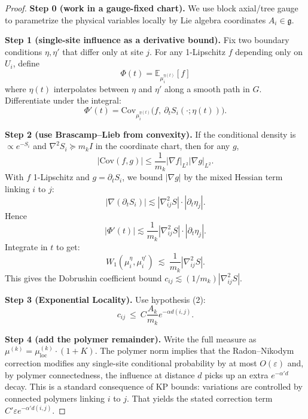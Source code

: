 \begin{proof}
\textbf{Step 0 (work in a gauge-fixed chart).}
We use block axial/tree gauge to parametrize the physical variables locally by Lie algebra coordinates $A_i\in\mathfrak g$.

\textbf{Step 1 (single-site influence as a derivative bound).}
Fix two boundary conditions $\eta,\eta'$ that differ only at site $j$. For any 1-Lipschitz $f$ depending only on $U_i$, define
\begin{equation}
\Phi(t)=\mathbb E_{\mu_i^{\eta(t)}}[f]
\end{equation}
where $\eta(t)$ interpolates between $\eta$ and $\eta'$ along a smooth path in $G$.
Differentiate under the integral:
\begin{equation}
\Phi'(t)=\mathrm{Cov}_{\mu_i^{\eta(t)}}\bigl(f,\ \partial_t S_i(\cdot;\eta(t))\bigr).
\end{equation}

\textbf{Step 2 (use Brascamp--Lieb from convexity).}
If the conditional density is $\propto e^{-S_i}$ and $\nabla^2 S_i\succeq m_k I$ in the coordinate chart, then for any $g$,
\begin{equation}
|\mathrm{Cov}(f,g)| \le \frac{1}{m_k}|\nabla f|_{L^2}|\nabla g|_{L^2}.
\end{equation}
With $f$ 1-Lipschitz and $g=\partial_t S_i$, we bound $|\nabla g|$ by the mixed Hessian term linking $i$ to $j$:
\begin{equation}
|\nabla(\partial_t S_i)|\lesssim |\nabla^2_{ij}S|\cdot |\partial_t \eta_j|.
\end{equation}
Hence
\begin{equation}
|\Phi'(t)|\lesssim \frac{1}{m_k}|\nabla^2_{ij}S|\cdot |\partial_t \eta_j|.
\end{equation}
Integrate in $t$ to get:
\begin{equation}
W_1(\mu_i^\eta,\mu_i^{\eta'})\ \lesssim\ \frac{1}{m_k}|\nabla^2_{ij}S|.
\end{equation}
This gives the Dobrushin coefficient bound $c_{ij}\lesssim (1/m_k)|\nabla^2_{ij}S|$.

\textbf{Step 3 (Exponential Locality).}
Use hypothesis (2):
\begin{equation}
c_{ij}\ \le\ C\frac{A_k}{m_k}e^{-\alpha d(i,j)}.
\end{equation}

\textbf{Step 4 (add the polymer remainder).}
Write the full measure as $\mu^{(k)}=\mu^{(k)}_{\mathrm{loc}}\cdot(1+K)$. The polymer norm implies that the Radon--Nikodym correction modifies any single-site conditional probability by at most $O(\varepsilon)$ and, by polymer connectedness, the influence at distance $d$ picks up an extra $e^{-\alpha'd}$ decay. This is a standard consequence of KP bounds: variations are controlled by connected polymers linking $i$ to $j$.
That yields the stated correction term $C'\varepsilon e^{-\alpha' d(i,j)}$.
\end{proof}

